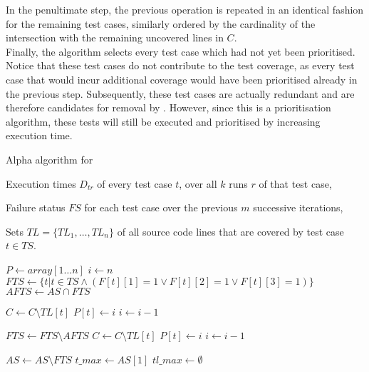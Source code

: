 \noindent In the penultimate step, the previous operation is repeated in an identical fashion for the remaining test cases, similarly ordered by the cardinality of the intersection with the remaining uncovered lines in $C$.\\

\noindent Finally, the algorithm selects every test case which had not yet been prioritised. Notice that these test cases do not contribute to the test coverage, as every test case that would incur additional coverage would have been prioritised already in the previous step. Subsequently, these test cases are actually redundant and are therefore candidates for removal by \tsm{}. However, since this is a prioritisation algorithm, these tests will still be executed and prioritised by increasing execution time.

\begin{algorithm}[htbp]
\caption{Alpha algorithm for \tcp{}}
\label{alg:alpha}
\begin{algorithmic}[1]
	
	Execution times $D_{tr}$ of every test case $t$, over all $k$ runs $r$ of that test case,
	
	Failure status $FS$ for each test case over the previous $m$ successive iterations,
	
	Sets $TL = \{TL_1, \dots, TL_n\}$ of all source code lines that are covered by test case $t \in TS$.
	
	
		
		\State $P \gets array[1 \dots n]$ 
		\State $i \gets n$
		\State $FTS \gets \{t \vert t \in TS \wedge (F[t][1] = 1 \vee F[t][2] = 1 \vee F[t][3] = 1)\}$
		\State $AFTS \gets AS \cap FTS$
		
		 
			\State $C \gets C \setminus TL[t]$
			\State $P[t] \gets i$
			\State $i \gets i - 1$
		\EndFor
		
		\State $FTS \gets FTS \setminus AFTS$
		 
			\State $C \gets C \setminus TL[t]$
			\State $P[t] \gets i$
			\State $i \gets i - 1$
		\EndFor
		
		\State $AS \gets AS \setminus FTS$
			\State $t\_max \gets AS[1]$ 
			\State $tl\_max \gets \emptyset$
			

\end{algorithmic}
\end{algorithm}
